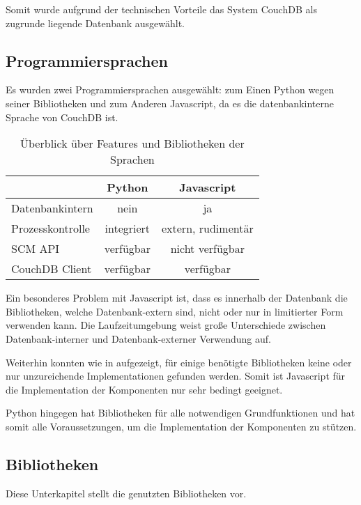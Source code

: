 Somit wurde aufgrund der technischen Vorteile das System CouchDB als zugrunde liegende Datenbank ausgewählt.

\subsection{Programmiersprachen}

Es wurden zwei Programmiersprachen ausgew\"ahlt:
zum Einen Python wegen seiner Bibliotheken und
zum Anderen Javascript, da es die datenbankinterne Sprache von CouchDB ist.

\begin{table}[ht]
\centering
\begin{tabular}{l|c|c}
                            & \textbf{Python} & \textbf{Javascript} \\
    \hline
    Datenbankintern         & nein            & ja \\
    Prozesskontrolle        & integriert      & extern, rudimentär \\
    SCM API                & verfügbar       & nicht verfügbar \\
    CouchDB Client          & verfügbar       & verfügbar \\
\end{tabular}
\caption{Überblick über Features und Bibliotheken der Sprachen}
\label{tab:python-vs-js}
\end{table}

Ein besonderes Problem mit Javascript ist,
dass es innerhalb der Datenbank die Bibliotheken, welche Datenbank-extern sind,
nicht oder nur in limitierter Form verwenden kann.
Die Laufzeitumgebung weist große Unterschiede
zwischen Datenbank-interner und Datenbank-externer Verwendung auf.

Weiterhin konnten wie in  aufgezeigt,
für einige benötigte Bibliotheken keine
oder nur unzureichende Implementationen gefunden werden.
Somit ist Javascript für die Implementation der Komponenten
nur sehr bedingt geeignet.

Python hingegen hat Bibliotheken für alle notwendigen Grundfunktionen
und hat somit alle Voraussetzungen,
um die Implementation der Komponenten zu stützen.

\subsection{Bibliotheken}

Diese Unterkapitel stellt die genutzten Bibliotheken vor.

